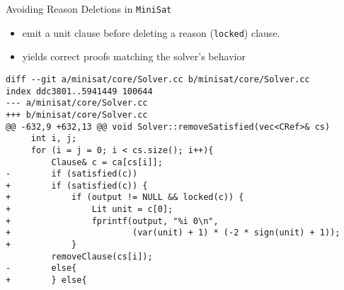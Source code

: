 \documentclass[final,hyperref={pdfpagelabels=true}]{beamer}
\begin{document}
\begin{frame}[fragile]
\begin{columns}[t]
\begin{column}{.45\textwidth}
    \begin{block}{Avoiding Reason Deletions in \texttt{MiniSat}}
	\begin{itemize}
            \item emit a unit clause before deleting a reason (\texttt{locked}) clause.
            \item yields correct proofs matching the solver's behavior
	\end{itemize}
	\vspace{1cm}
        {\footnotesize
            \begin{verbatim}
diff --git a/minisat/core/Solver.cc b/minisat/core/Solver.cc
index ddc3801..5941449 100644
--- a/minisat/core/Solver.cc
+++ b/minisat/core/Solver.cc
@@ -632,9 +632,13 @@ void Solver::removeSatisfied(vec<CRef>& cs)
     int i, j;
     for (i = j = 0; i < cs.size(); i++){
         Clause& c = ca[cs[i]];
-        if (satisfied(c))
+        if (satisfied(c)) {
+            if (output != NULL && locked(c)) {
+                Lit unit = c[0];
+                fprintf(output, "%i 0\n",
+                        (var(unit) + 1) * (-2 * sign(unit) + 1));
+            }
         removeClause(cs[i]);
-        else{
+        } else{
            \end{verbatim}
        }
    \end{block}
    \end{column}


\end{columns}
\end{frame}
\end{document}
